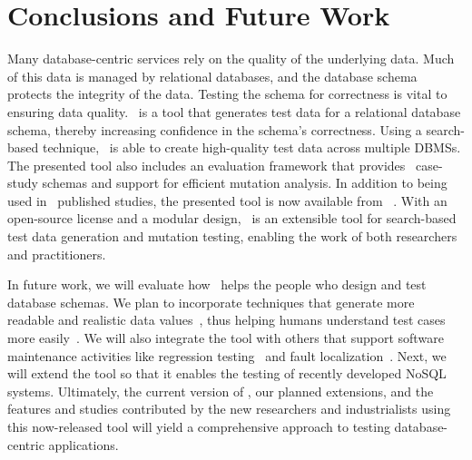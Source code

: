 
\section{Conclusions and Future Work}\label{sec:conclusion}


Many database-centric services rely on the quality of the underlying data. Much of this data is managed by relational
databases, and the database schema protects the integrity of the data. Testing the schema for correctness is vital to
ensuring data quality. \sa~is a tool that generates test data for a relational database schema, thereby increasing
confidence in the schema's correctness. Using a search-based technique, \sa~is able to create high-quality test data
across multiple DBMSs. The presented tool also includes an evaluation framework that provides
\numprovidedschemas~case-study schemas and support for efficient mutation analysis. In addition to being used in
\numuniquepapers~published studies, the presented tool is now available from \sawebsite~\cite{tool}. With an open-source
license and a modular design, \sa~is an extensible tool for search-based test data generation and mutation testing,
enabling the work of both researchers and practitioners.


In future work, we will evaluate how \sa~helps the people who design and test database schemas.  We plan to
incorporate techniques that generate more readable and realistic data
values~\cite{Afshan2013,McMinn2012,Shahbaz2012,Shahbaz2015}, thus helping humans understand test cases more
easily~\cite{Fraser2015, Fraser2013}. We will also integrate the tool with others that support software maintenance
activities like regression testing~\cite{Kapfhammer2008} and fault localization~\cite{Clark2011}. Next, we will extend
the tool so that it enables the testing of recently developed NoSQL systems. Ultimately, the current version of \sa, our
planned extensions, and the features and studies contributed by the new researchers and industrialists using this
now-released tool will yield a comprehensive approach to testing database-centric applications.
